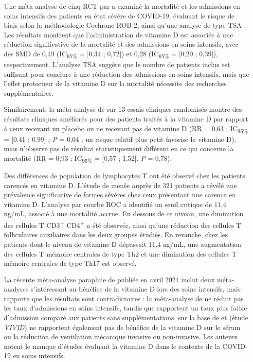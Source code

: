 \documentclass[
  a4paper,
  DIV=11,
  numbers=noendperiod,
  listof=totoc]{scrreprt}
\begin{document}
Une méta-analyse de cinq \ac{RCT} par \textcite{Argano.2023} a examiné
la mortalité et les admissions en soins intensifs des patients en état
sévère de COVID-19, évaluant le risque de biais selon la méthodologie
Cochrane ROB 2, ainsi qu'une analyse de type \ac{TSA}
\autocite{Kang.2021}. Les résultats montrent que l'administration de
vitamine D est associée à une réduction significative de la mortalité et
des admissions en soins intensifs, avec des \ac{SMD} de 0,49
(IC\textsubscript{95\%} = {[}0,34 ; 0,72{]}) et 0,28
(IC\textsubscript{95\%} = {[}0,20 ; 0,39{]}), respectivement. L'analyse
\ac{TSA} suggère que le nombre de patients inclus est suffisant pour
conclure à une réduction des admissions en soins intensifs, mais que
l'effet protecteur de la vitamine D sur la mortalité nécessite des
recherches supplémentaires.

Similairement, la méta-analyse de \textcite{Sîrbu.2023} sur 13 essais
cliniques randomisés montre des résultats cliniques améliorés pour des
patients traités à la vitamine D par rapport à ceux recevant un placebo
ou ne recevant pas de vitamine D (\ac{RR} = 0,63 ;
IC\textsubscript{95\%} = {[}0.41 ; 0.99{]} ; \emph{P} = 0,04 ; un risque
relatif plus petit favorise la vitamine D), mais n'observe pas de
résultat statistiquement différent en ce qui concerne la mortalité
(\ac{RR} = 0,93 ; IC\textsubscript{95\%} = {[}0,57 ; 1,52{]}, \emph{P} =
0,78).

Des différences de population de lymphocytes T ont été observé chez les
patients carencés en vitamine D. L'étude de
\textcite{Karonova.2022.pharmaceuticals} menée auprès de 321 patients a
révélé une prévalence significative de formes sévères chez ceux
présentant une carence en vitamine D. L'analyse par courbe ROC a
identifié un seuil critique de 11,4 ng/mL, associé à une mortalité
accrue. En dessous de ce niveau, une diminution des cellules T
CD3\textsuperscript{+} CD4\textsuperscript{+} a été observée, ainsi
qu'une réduction des cellules T folliculaires auxiliaires dans les deux
groupes étudiés. En revanche, chez les patients dont le niveau de
vitamine D dépassait 11,4 ng/mL, une augmentation des cellules T mémoire
centrales de type Th2 et une diminution des cellules T mémoire centrales
de type Th17 est observé.

La récente méta-analyse parapluie de \textcite{Jamilian.2024} publiée en
avril 2024 inclut deux méta-analyses s'intéressant au bénéfice de la
vitamine D lors des soins intensifs, mais rapporte que les résultats
sont contradictoires : la méta-analyse de \textcite{Rawat.2021} ne
réduit pas les taux d'admissions en soins intensifs, tandis que
\textcite{Shah.2021} rapportent un taux plus faible d'admission comparé
aux patients sans supplémentations. \textcite{Jamilian.2024} sur la base
de \textcite{Rawat.2021} et \textcite{Bassatne.2021} (étude
\emph{VIVID}) ne rapportent également pas de bénéfice de la vitamine D
sur le sérum ou la réduction de ventilation mécanique invasive ou
non-invasive. Les auteurs notent le manque d'études évaluant la vitamine
D dans le contexte de la COVID-19 en soins intensifs.
\end{document}
